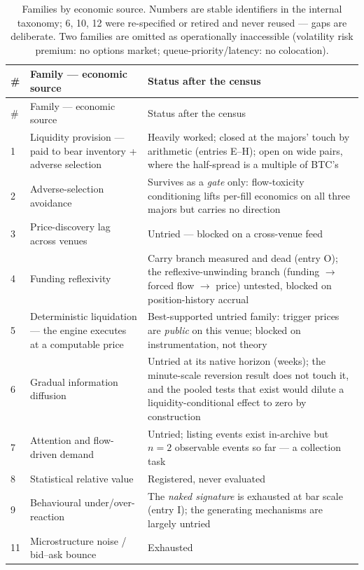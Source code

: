 \documentclass[11pt,a4paper]{article}
\newcommand{\toprule}{\hline\hline}
\newcommand{\midrule}{\hline}
\newcommand{\bottomrule}{\hline\hline}
\begin{document}
{\small
\begin{longtable}{p{0.5cm} p{5.6cm} p{7.6cm}}
\caption{Families by economic source. Numbers are stable identifiers
in the internal taxonomy; 6, 10, 12 were re-specified or retired and
never reused --- gaps are deliberate. Two families are omitted as
operationally inaccessible (volatility risk premium: no options
market; queue-priority/latency: no colocation).}
\label{tab:families}\\
\toprule
\# & Family --- economic source & Status after the census \\
\midrule
\endfirsthead
\toprule
\# & Family --- economic source & Status after the census \\
\midrule
\endhead
1 & Liquidity provision --- paid to bear inventory + adverse selection
\citep[cf.][]{grossman1988, avellaneda2008} & Heavily worked; closed at
the majors' touch by arithmetic (entries E--H); open on wide pairs,
where the half-spread is a multiple of BTC's \\
2 & Adverse-selection avoidance \citep[cf.][]{kyle1985, easley2012} &
Survives as a \emph{gate} only: flow-toxicity conditioning lifts
per-fill economics on all three majors but carries no direction \\
3 & Price-discovery lag across venues \citep[cf.][]{hasbrouck1995,
makarov2020} & Untried --- blocked on a cross-venue feed \\
4 & Funding reflexivity & Carry branch measured and dead (entry O);
the reflexive-unwinding branch (funding $\to$ forced flow $\to$ price)
untested, blocked on position-history accrual \\
5 & Deterministic liquidation --- the engine executes at a computable
price \citep[nearest analogue][]{coval2007} & Best-supported untried
family: trigger prices are \emph{public} on this venue; blocked on
instrumentation, not theory \\
6 & Gradual information diffusion \citep[cf.][]{hong1999, hong2000} &
Untried at its native horizon (weeks); the minute-scale reversion
result does not touch it, and the pooled tests that exist would dilute
a liquidity-conditional effect to zero by construction \\
7 & Attention and flow-driven demand \citep[cf.][]{barber2008} &
Untried; listing events exist in-archive but $n=2$ observable events
so far --- a collection task \\
8 & Statistical relative value \citep[cf.][]{gatev2006} & Registered,
never evaluated \\
9 & Behavioural under/over-reaction \citep[cf.][]{jegadeesh1993,
debondt1985} & The \emph{naked signature} is exhausted at bar scale
(entry I); the generating mechanisms are largely untried \\
11 & Microstructure noise / bid--ask bounce \citep[cf.][]{roll1984} &
Exhausted \\
\bottomrule
\end{longtable}}
\end{document}
